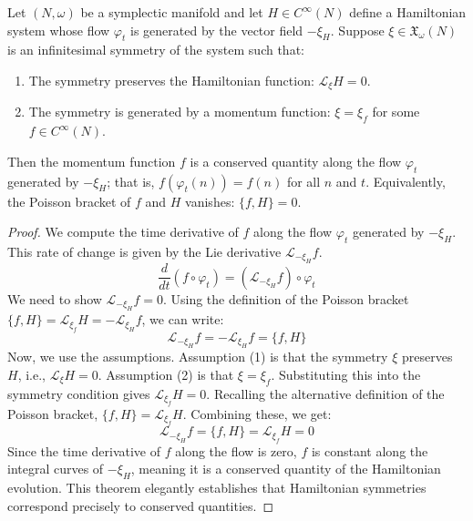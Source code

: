 \begin{theorem}
\label{thm:noether_hamiltonian}
Let $(N, \omega)$ be a symplectic manifold and let $H \in C^\infty(N)$ define a Hamiltonian system whose flow $\varphi_t$ is generated by the vector field $-\xi_H$. Suppose $\xi \in \mathfrak{X}_{\omega}(N)$ is an infinitesimal symmetry of the system such that:
\begin{enumerate}
    \item The symmetry preserves the Hamiltonian function: $\mathcal{L}_\xi H = 0$.
    \item The symmetry is generated by a momentum function: $\xi = \xi_f$ for some $f \in C^\infty(N)$.
\end{enumerate}
Then the momentum function $f$ is a conserved quantity along the flow $\varphi_t$ generated by $-\xi_H$; that is, $f(\varphi_t(n)) = f(n)$ for all $n$ and $t$. Equivalently, the Poisson bracket of $f$ and $H$ vanishes: $\{f, H\} = 0$.
\end{theorem}
\begin{proof}
We compute the time derivative of $f$ along the flow $\varphi_t$ generated by $-\xi_H$. This rate of change is given by the Lie derivative $\mathcal{L}_{-\xi_H} f$.
\[ \frac{d}{dt} (f \circ \varphi_t) = (\mathcal{L}_{-\xi_H} f) \circ \varphi_t \]
We need to show $\mathcal{L}_{-\xi_H} f = 0$. Using the definition of the Poisson bracket $\{f, H\} = \mathcal{L}_{\xi_f} H = -\mathcal{L}_{\xi_H} f$, we can write:
\[ \mathcal{L}_{-\xi_H} f = - \mathcal{L}_{\xi_H} f = \{f, H\} \]
Now, we use the assumptions. Assumption (1) is that the symmetry $\xi$ preserves $H$, i.e., $\mathcal{L}_\xi H = 0$. Assumption (2) is that $\xi = \xi_f$. Substituting this into the symmetry condition gives $\mathcal{L}_{\xi_f} H = 0$.
Recalling the alternative definition of the Poisson bracket, $\{f, H\} = \mathcal{L}_{\xi_f} H$.
Combining these, we get:
\[ \mathcal{L}_{-\xi_H} f = \{f, H\} = \mathcal{L}_{\xi_f} H = 0 \] 
Since the time derivative of $f$ along the flow is zero, $f$ is constant along the integral curves of $-\xi_H$, meaning it is a conserved quantity of the Hamiltonian evolution. This theorem elegantly establishes that Hamiltonian symmetries correspond precisely to conserved quantities.
\end{proof}

